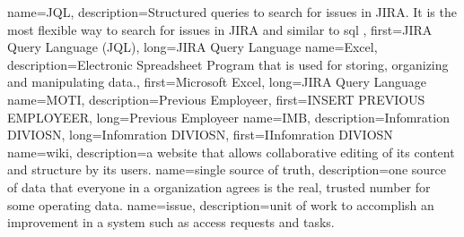 {
	name={JQL},
	description={Structured queries to search for issues in JIRA. It is the most flexible way to search for issues in JIRA and similar to \gls{sql} },
	first={JIRA Query Language (JQL)},
	long={JIRA Query Language}
}
{
	name={Excel},
	description={Electronic Spreadsheet Program that is used for storing, organizing and manipulating data.},
	first={Microsoft Excel},
	long={JIRA Query Language}
}
{
	name={MOTI},
	description={Previous Employeer},
	first={INSERT PREVIOUS EMPLOYEER},
	long={Previous Employeer}
}
{
	name={IMB},
	description={Infomration DIVIOSN},
	long={Infomration DIVIOSN},
	first={IInfomration DIVIOSN}
}
{
	name={wiki},
	description={a website that allows collaborative editing of its content and structure by its users.}
}
{
	name={single source of truth},
	description={one source of data that everyone in a organization agrees is the real, trusted number for some operating data.}
}
{
	name={issue},
	description={unit of work to accomplish an improvement in a system such as access requests and tasks.}
}
\makeglossaries
